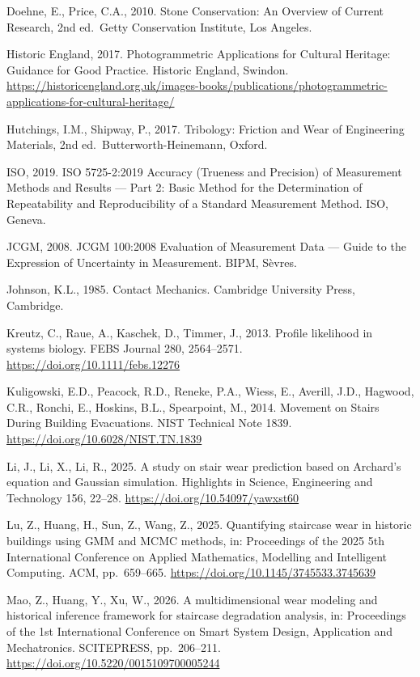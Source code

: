 \documentclass[
]{article}
\begin{document}
Doehne, E., Price, C.A., 2010. Stone Conservation: An Overview of
Current Research, 2nd ed.~Getty Conservation Institute, Los Angeles.

Historic England, 2017. Photogrammetric Applications for Cultural
Heritage: Guidance for Good Practice. Historic England, Swindon.
\url{https://historicengland.org.uk/images-books/publications/photogrammetric-applications-for-cultural-heritage/}

Hutchings, I.M., Shipway, P., 2017. Tribology: Friction and Wear of
Engineering Materials, 2nd ed.~Butterworth-Heinemann, Oxford.

ISO, 2019. ISO 5725-2:2019 Accuracy (Trueness and Precision) of
Measurement Methods and Results --- Part 2: Basic Method for the
Determination of Repeatability and Reproducibility of a Standard
Measurement Method. ISO, Geneva.

JCGM, 2008. JCGM 100:2008 Evaluation of Measurement Data --- Guide to
the Expression of Uncertainty in Measurement. BIPM, Sèvres.

Johnson, K.L., 1985. Contact Mechanics. Cambridge University Press,
Cambridge.

Kreutz, C., Raue, A., Kaschek, D., Timmer, J., 2013. Profile likelihood
in systems biology. FEBS Journal 280, 2564--2571.
\url{https://doi.org/10.1111/febs.12276}

Kuligowski, E.D., Peacock, R.D., Reneke, P.A., Wiess, E., Averill, J.D.,
Hagwood, C.R., Ronchi, E., Hoskins, B.L., Spearpoint, M., 2014. Movement
on Stairs During Building Evacuations. NIST Technical Note 1839.
\url{https://doi.org/10.6028/NIST.TN.1839}

Li, J., Li, X., Li, R., 2025. A study on stair wear prediction based on
Archard's equation and Gaussian simulation. Highlights in Science,
Engineering and Technology 156, 22--28.
\url{https://doi.org/10.54097/yawxst60}

Lu, Z., Huang, H., Sun, Z., Wang, Z., 2025. Quantifying staircase wear
in historic buildings using GMM and MCMC methods, in: Proceedings of the
2025 5th International Conference on Applied Mathematics, Modelling and
Intelligent Computing. ACM, pp.~659--665.
\url{https://doi.org/10.1145/3745533.3745639}

Mao, Z., Huang, Y., Xu, W., 2026. A multidimensional wear modeling and
historical inference framework for staircase degradation analysis, in:
Proceedings of the 1st International Conference on Smart System Design,
Application and Mechatronics. SCITEPRESS, pp.~206--211.
\url{https://doi.org/10.5220/0015109700005244}
\end{document}
